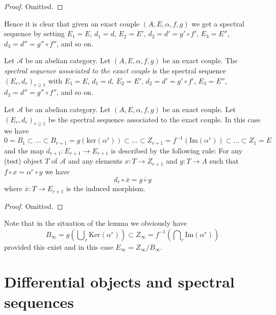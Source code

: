 \begin{proof}
Omitted.
\end{proof}

\noindent
Hence it is clear that given an exact couple $(A, E, \alpha, f, g)$
we get a spectral sequence by setting $E_1 = E$, $d_1 = d$,
$E_2 = E'$, $d_2 = d' = g' \circ f'$, $E_3 = E''$, $d_3 = d'' = g'' \circ f''$,
and so on.

\begin{definition}
\label{definition-spectral-sequence-associated-exact-couple}
Let $\mathcal{A}$ be an abelian category.
Let $(A, E, \alpha, f, g)$ be an exact couple.
The {\it spectral sequence associated to the exact couple}
is the spectral sequence $(E_r, d_r)_{r \geq 1}$ with
$E_1 = E$, $d_1 = d$, $E_2 = E'$, $d_2 = d' = g' \circ f'$,
$E_3 = E''$, $d_3 = d'' = g'' \circ f''$,
and so on.
\end{definition}

\begin{lemma}
\label{lemma-spectral-sequence-associated-exact-couple}
Let $\mathcal{A}$ be an abelian category.
Let $(A, E, \alpha, f, g)$ be an exact couple.
Let $(E_r, d_r)_{r \geq 1}$ be the spectral sequence
associated to the exact couple.
In this case we have
$$
0 = B_1 \subset \ldots \subset
B_{r + 1} = g(\text{ker}(\alpha^r))
\subset \ldots \subset
Z_{r + 1} = f^{-1}(\text{Im}(\alpha^r))
\subset \ldots \subset Z_1 = E
$$
and the map $d_{r + 1} : E_{r + 1} \to E_{r + 1}$
is described by the following rule:
For any (test) object $T$ of $\mathcal{A}$ and any elements
$x : T \to Z_{r + 1}$ and $y : T \to A$ such that
$f \circ x = \alpha^r \circ y$ we have
$$
d_r \circ \overline{x} = \overline{g \circ y}
$$
where $\overline{x} : T \to E_{r + 1}$ is the
induced morphism.
\end{lemma}

\begin{proof}
Omitted.
\end{proof}

\noindent
Note that in the situation of the lemma we obviously have
$$
B_\infty = g\left(\bigcup\nolimits_r \text{Ker}(\alpha^r)\right)
\subset
Z_\infty = f^{-1}\left(\bigcap\nolimits_r \text{Im}(\alpha^r)\right)
$$
provided this exist and in this case $E_\infty = Z_\infty / B_\infty$.






\section{Differential objects and spectral sequences}
\label{section-differential-object}

